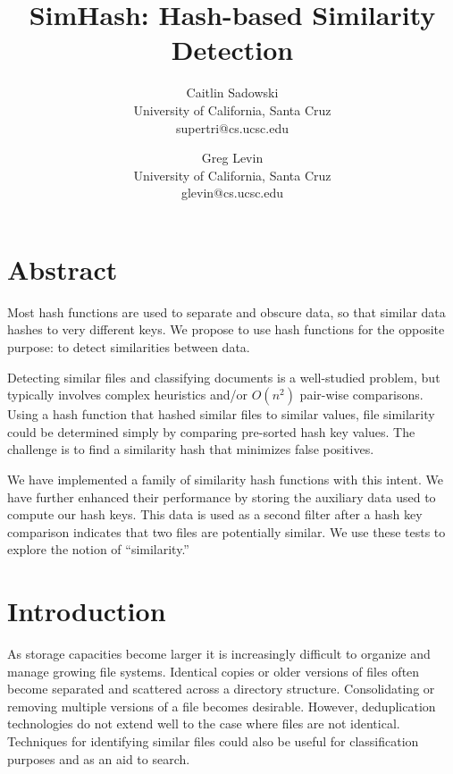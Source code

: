 \documentclass[10pt, twocolumn]{article}
\begin{document}
\title{SimHash: Hash-based Similarity Detection}

\author{Caitlin Sadowski\\
University of California, Santa Cruz\\
supertri@cs.ucsc.edu\\
\and
Greg Levin\\
University of California, Santa Cruz\\
glevin@cs.ucsc.edu}


\def\copyrightspace{}

\maketitle

\section{Abstract}

Most hash functions are used to separate and obscure data, so that similar data hashes to very different keys.  We propose to use hash functions for the opposite purpose: to detect similarities between data. 

Detecting similar files and classifying documents is a well-studied problem, but typically involves complex heuristics and/or $O(n^2)$ pair-wise comparisons. Using a hash function that hashed similar files to similar values, file similarity could be determined simply by comparing pre-sorted hash key values.  The challenge is to find a similarity hash that minimizes false positives. 

We have implemented a family of similarity hash functions with this intent.  We have further enhanced their performance by storing the auxiliary data used to compute our hash keys.  This data is used as a second filter after a hash key comparison indicates that two files are potentially similar.  We use these tests to explore the notion of ``similarity.''


\section{Introduction}

As storage capacities become larger it is increasingly difficult to organize and manage growing file systems. Identical copies or older versions of files often become separated and scattered across a directory structure. Consolidating or removing multiple versions of a file becomes desirable. However, deduplication technologies do not extend well to the case where files are not identical. Techniques for identifying similar files could also be useful for classification purposes and as an aid to search.  
\end{document}
